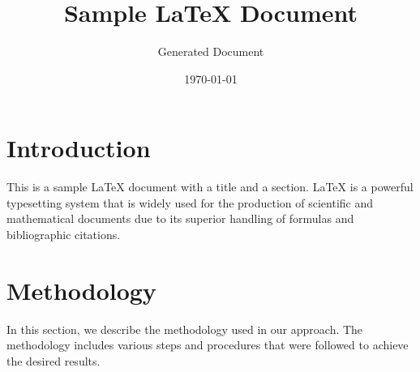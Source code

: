 \documentclass{article}
\title{Sample LaTeX Document}
\author{Generated Document}
\date{\today}
\begin{document}
\maketitle

\section{Introduction}
This is a sample LaTeX document with a title and a section. LaTeX is a powerful typesetting system that is widely used for the production of scientific and mathematical documents due to its superior handling of formulas and bibliographic citations.

\section{Methodology}
In this section, we describe the methodology used in our approach. The methodology includes various steps and procedures that were followed to achieve the desired results.
\end{document}
